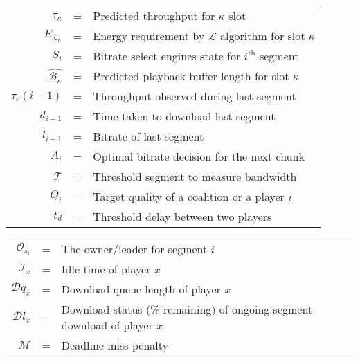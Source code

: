 \begin{table}[h!]
\begin{tabular}{rcl}
	$\hat{\tau}_{{\kappa}}$ &=& Predicted throughput for $\kappa$ slot\\
	$E_{\mathrm{\mathcal{L}}_\kappa}$ &=& Energy requirement by $\mathcal{L}$ algorithm for slot $\kappa$ \\
	$S_{i}$ &=& Bitrate select engines state for $i^\text{th}$ segment \\
	$\hat{\mathcal{B}_\kappa}$ &=& Predicted playback buffer length for slot $\kappa$ \\
	$\tau_c(i-1)$ &=& Throughput observed during last segment \\
	$d_{i-1}$ &=& Time taken to download last segment \\
	$l_{i-1}$ &=& Bitrate of last segment \\
	$A_i$ &=& Optimal bitrate decision for the next chunk \\
	$\mathcal{T}$ &=& Threshold segment to measure bandwidth \\
	$Q_i$ &=& Target quality of a coalition or a player $i$ \\
	$t_d$ &=& Threshold delay between two players \\
\end{tabular}
\end{table}

\makeatletter
\setlength{\@fptop}{0pt}
\makeatother

\begin{table}[ht!]
\begin{tabular}{rcl}
	$\mathcal{O}_{s_{i}}$ &=& The owner/leader for segment $i$ \\
	$\mathcal{I}_x$ &=& Idle time of player $x$ \\
	$\mathcal{D}{q_x}$ &=& Download queue length of player $x$ \\
	$\mathcal{D}{l_x}$ &=& Download status (\% remaining) of ongoing segment download of player $x$\\
	$\mathcal{M}$ &=& Deadline miss penalty \\
\end{tabular}
\end{table}
\vfill
